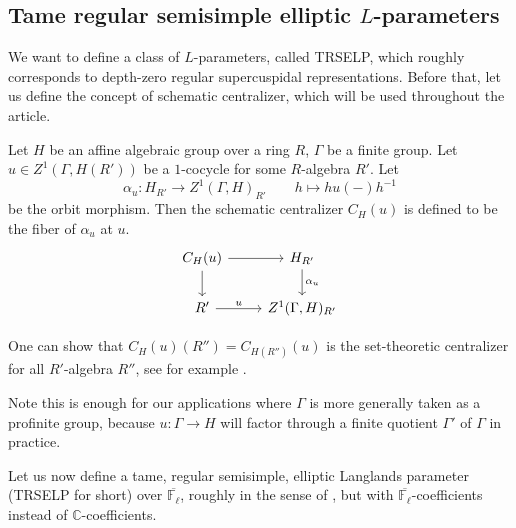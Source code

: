 	\subsection{Tame regular semisimple elliptic $L$-parameters}\label{Subsection TRSELP}
	
	We want to define a class of $L$-parameters, called TRSELP, which roughly corresponds to depth-zero regular supercuspidal representations. Before that, let us define the concept of schematic centralizer, which will be used throughout the article.
	
	\begin{definition}\label{Definition: Schematic centralizer}
	Let $H$ be an affine algebraic group over a ring $R$, $\Gamma$ be a finite group. Let $u \in Z^1(\Gamma, H(R'))$ be a $1$-cocycle for some $R$-algebra $R'$. Let 
	$$\alpha_u: H_{R'} \longrightarrow Z^1(\Gamma, H)_{R'}\qquad h \longmapsto hu(-)h^{-1}$$
	 be the orbit morphism. Then the schematic centralizer $C_H(u)$ is defined to be the fiber of $\alpha_u$ at $u$.
	$$	
	\begin{tikzcd}
		{C_H(u)} \arrow[r, ""] \arrow[d, ""] & {H_{R'}} \arrow[d, "{\alpha_u}"] \\
		{R'} \arrow[r, "u"]                & {Z^1(\Gamma, H)_{R'}}               
	\end{tikzcd}
	$$	
	\end{definition}
	
	One can show that $C_H(u)(R'')=C_{H(R'')}(u)$ is the set-theoretic centralizer for all $R'$-algebra $R''$, see for example \cite[Appendix A]{dhkm2020moduli}.
	
	\begin{remark}
			Note this is enough for our applications where $\Gamma$ is more generally taken as a profinite group, because $u: \Gamma \to H$ will factor through a finite quotient $\Gamma'$ of $\Gamma$ in practice.
	\end{remark}
	
	Let us now define a tame, regular semisimple, elliptic Langlands parameter (TRSELP for short) over $\overline{\mathbb{F}_{\ell}}$, roughly in the sense of \cite[Section 3.4, 4.1]{debacker2009depth}, but with $\overline{\mathbb{F}_{\ell}}$-coefficients instead of $\mathbb{C}$-coefficients.
	
